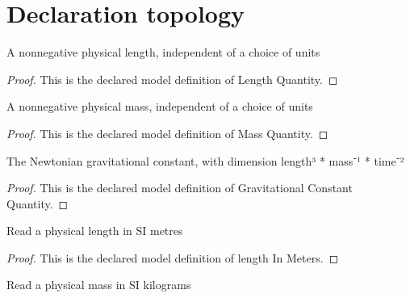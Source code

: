 \section{Declaration topology}
\begin{definition}
  \label{def:physics:phyx-mini-0708:phyxminiproblems-problemphyxmini0708-lengthquantity}
  A nonnegative physical length, independent of a choice of units
\end{definition}
\begin{proof}
  This is the declared model definition of Length Quantity.
\end{proof}
\begin{definition}
  \label{def:physics:phyx-mini-0708:phyxminiproblems-problemphyxmini0708-massquantity}
  A nonnegative physical mass, independent of a choice of units
\end{definition}
\begin{proof}
  This is the declared model definition of Mass Quantity.
\end{proof}
\begin{definition}
  \label{def:physics:phyx-mini-0708:phyxminiproblems-problemphyxmini0708-gravitationalconstantquantity}
  The Newtonian gravitational constant, with dimension length³ * mass⁻¹ * time⁻²
\end{definition}
\begin{proof}
  This is the declared model definition of Gravitational Constant Quantity.
\end{proof}
\begin{definition}
  \label{def:physics:phyx-mini-0708:phyxminiproblems-problemphyxmini0708-lengthinmeters}
  Read a physical length in SI metres
\end{definition}
\begin{proof}
  This is the declared model definition of length In Meters.
\end{proof}
\begin{definition}
  \label{def:physics:phyx-mini-0708:phyxminiproblems-problemphyxmini0708-massinkilograms}
  Read a physical mass in SI kilograms
\end{definition}
